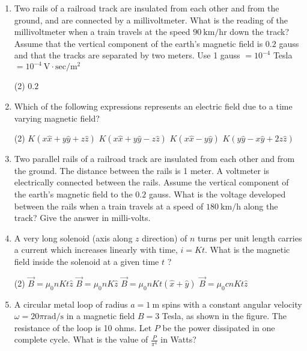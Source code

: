 \begin{enumerate}
	\item Two rails of a railroad track are insulated from each other and from the ground, and are connected by a millivoltmeter. What is the reading of the millivoltmeter when a train travels at the speed $90 \mathrm{~km} / \mathrm{hr}$ down the track? Assume that the vertical component of the earth's magnetic field is $0.2$ gauss and that the tracks are separated by two meters. Use 1 gauss $=10^{-4}$ Tesla $=10^{-4} \mathrm{~V} \cdot \mathrm{sec} / \mathrm{m}^{2}$
	{}
	 \begin{tasks}(2)
		\task[\textbf{c.}]$0.2$
	\end{tasks}
\item 	Which of the following expressions represents an electric field due to a time varying magnetic field?
	{}
 \begin{tasks}(2)
	\task[\textbf{a.}]$K(x \hat{x}+y \hat{y}+z \hat{z})$
	\task[\textbf{b.}] $K(x \hat{x}+y \hat{y}-z \hat{z})$
	\task[\textbf{c.}]$K(x \hat{x}-y \hat{y})$
	\task[\textbf{d.}]$K(y \hat{y}-x \hat{y}+2 z \hat{z})$ 
\end{tasks}	
\item Two parallel rails of a railroad track are insulated from each other and from the ground. The distance between the rails is 1 meter. A voltmeter is electrically connected between the rails. Assume the vertical component of the earth's magnetic field to the $0.2$ gauss. What is the voltage developed between the rails when a train travels at a speed of $180 \mathrm{~km} / \mathrm{h}$ along the track? Give the answer in milli-volts.
	{}
\item 	A very long solenoid (axis along $z$ direction) of $n$ turns per unit length carries a current which increases linearly with time, $i=K t$. What is the magnetic field inside the solenoid at a given time $t$ ?
	{}
 \begin{tasks}(2)
	\task[\textbf{a.}]$\vec{B}=\mu_{0} n K t \hat{z}$
	\task[\textbf{b.}]$\vec{B}=\mu_{0} n K \hat{z}$
	\task[\textbf{c.}]$\vec{B}=\mu_{0} n K t(\hat{x}+\hat{y})$
	\task[\textbf{d.}] $\vec{B}=\mu_{0} c n K t \hat{z}$
\end{tasks}	
\item 	A circular metal loop of radius $a=1 \mathrm{~m}$ spins with a constant angular velocity $\omega=20 \pi \mathrm{rad} / \mathrm{s}$ in a magnetic field $B=3$ Tesla, as shown in the figure. The resistance of the loop is 10 ohms. Let $P$ be the power dissipated in one complete cycle. What is the value of $\frac{P}{\pi^{4}}$ in Watts?

\end{enumerate}
